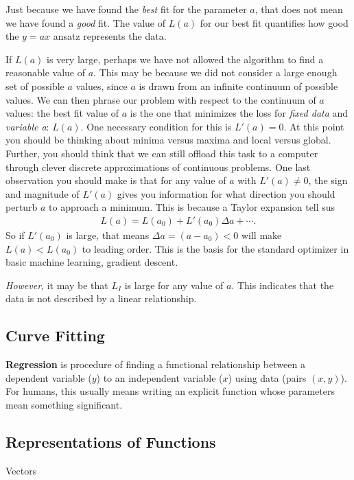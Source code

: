 \documentclass[12pt]{article}
\begin{document}
Just because we have found the \emph{best} fit for the parameter $a$, that does not mean we have found a \emph{good} fit. The value of $L(a)$ for our best fit quantifies how good the $y=ax$ ansatz represents the data. 


If $L(a)$ is very large, perhaps we have not allowed the algorithm to find a reasonable value of $a$. This may be because we did not consider a large enough set of possible $a$ values, since $a$ is drawn from an infinite continuum of possible values. We can then phrase our problem with respect to the continuum of $a$ values: the best fit value of $a$ is the one that minimizes the loss for \emph{fixed data} and \emph{variable a}: $L(a)$. One necessary condition for this is $L'(a) = 0$. At this point you should be thinking about minima versus maxima and local versus global. Further, you should think that we can still offload this task to a computer through clever discrete approximations of continuous problems. One last observation you should make is that for any value of $a$ with $L'(a)\neq 0$, the sign and magnitude of $L'(a)$ gives you information for what direction you should perturb $a$ to approach a minimum. This is because a Taylor expansion tell sus
\begin{align}
    L(a) = L(a_0) + L'(a_0) \Delta a + \cdots .
\end{align}
So if $L'(a_0)$ is large, that means $\Delta a = (a-a_0) <0$ will make $L(a) < L(a_0)$ to leading order. This is the basis for the standard optimizer in basic machine learning, gradient descent.


\emph{However}, it may be that $L_I$ is large for any value of $a$. This indicates that the data is not described by a linear relationship. 

\subsection{Curve Fitting}

\textbf{Regression} is procedure of finding a functional relationship between a dependent variable ($y$) to an independent variable ($x$) using data (pairs $(x,y)$). For humans, this usually means writing an explicit function whose parameters mean something significant. 

\subsection{Representations of Functions}

Vectors
\end{document}
